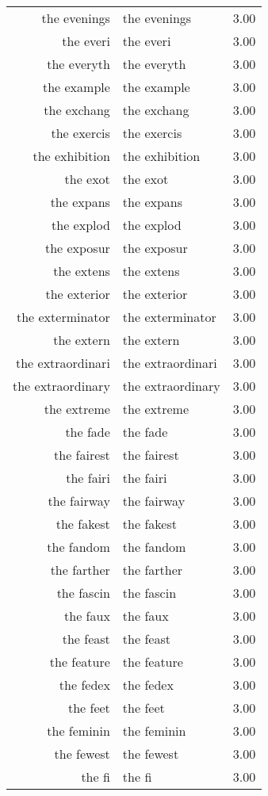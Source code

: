 \begin{table}[ht]
\begin{tabular}{rlr}
  the evenings & the evenings & 3.00 \\ 
  the everi & the everi & 3.00 \\ 
  the everyth & the everyth & 3.00 \\ 
  the example & the example & 3.00 \\ 
  the exchang & the exchang & 3.00 \\ 
  the exercis & the exercis & 3.00 \\ 
  the exhibition & the exhibition & 3.00 \\ 
  the exot & the exot & 3.00 \\ 
  the expans & the expans & 3.00 \\ 
  the explod & the explod & 3.00 \\ 
  the exposur & the exposur & 3.00 \\ 
  the extens & the extens & 3.00 \\ 
  the exterior & the exterior & 3.00 \\ 
  the exterminator & the exterminator & 3.00 \\ 
  the extern & the extern & 3.00 \\ 
  the extraordinari & the extraordinari & 3.00 \\ 
  the extraordinary & the extraordinary & 3.00 \\ 
  the extreme & the extreme & 3.00 \\ 
  the fade & the fade & 3.00 \\ 
  the fairest & the fairest & 3.00 \\ 
  the fairi & the fairi & 3.00 \\ 
  the fairway & the fairway & 3.00 \\ 
  the fakest & the fakest & 3.00 \\ 
  the fandom & the fandom & 3.00 \\ 
  the farther & the farther & 3.00 \\ 
  the fascin & the fascin & 3.00 \\ 
  the faux & the faux & 3.00 \\ 
  the feast & the feast & 3.00 \\ 
  the feature & the feature & 3.00 \\ 
  the fedex & the fedex & 3.00 \\ 
  the feet & the feet & 3.00 \\ 
  the feminin & the feminin & 3.00 \\ 
  the fewest & the fewest & 3.00 \\ 
  the fi & the fi & 3.00 \\ 

\end{tabular}
\end{table}
